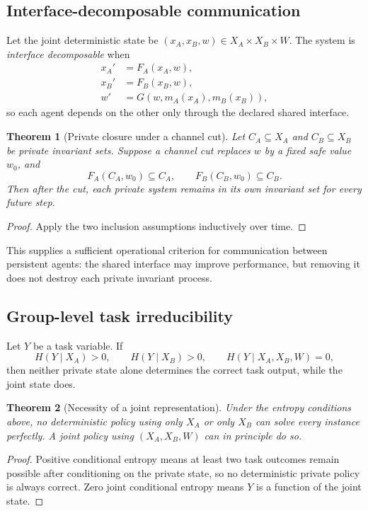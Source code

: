 \documentclass[11pt]{article}
\newtheorem{theorem}{Theorem}[section]
\theoremstyle{definition}
\theoremstyle{remark}
\begin{document}
\subsection{Interface-decomposable communication}

Let the joint deterministic state be \((x_A,x_B,w)\in X_A\times X_B\times W\). The system is \emph{interface decomposable} when
\[
\begin{aligned}
x_A'&=F_A(x_A,w),\\
x_B'&=F_B(x_B,w),\\
w'&=G(w,m_A(x_A),m_B(x_B)),
\end{aligned}
\]
so each agent depends on the other only through the declared shared interface.

\begin{theorem}[Private closure under a channel cut]
Let \(C_A\subseteq X_A\) and \(C_B\subseteq X_B\) be private invariant sets. Suppose a channel cut replaces \(w\) by a fixed safe value \(w_0\), and
\[
F_A(C_A,w_0)\subseteq C_A,
\qquad
F_B(C_B,w_0)\subseteq C_B.
\]
Then after the cut, each private system remains in its own invariant set for every future step.
\end{theorem}

\begin{proof}
Apply the two inclusion assumptions inductively over time.
\end{proof}

This supplies a sufficient operational criterion for communication between persistent agents: the shared interface may improve performance, but removing it does not destroy each private invariant process.

\subsection{Group-level task irreducibility}

Let \(Y\) be a task variable. If
\[
H(Y\mid X_A)>0,
\qquad
H(Y\mid X_B)>0,
\qquad
H(Y\mid X_A,X_B,W)=0,
\]
then neither private state alone determines the correct task output, while the joint state does.

\begin{theorem}[Necessity of a joint representation]
Under the entropy conditions above, no deterministic policy using only \(X_A\) or only \(X_B\) can solve every instance perfectly. A joint policy using \((X_A,X_B,W)\) can in principle do so.
\end{theorem}

\begin{proof}
Positive conditional entropy means at least two task outcomes remain possible after conditioning on the private state, so no deterministic private policy is always correct. Zero joint conditional entropy means \(Y\) is a function of the joint state.
\end{proof}
\end{document}
